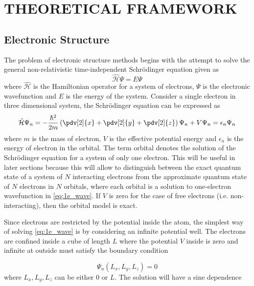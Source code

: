 \chapter{THEORETICAL FRAMEWORK}
\section{Electronic Structure}
The problem of electronic structure methods begins with the attempt to solve the general non-relativistic time-independent Schr\"{o}dinger equation given as \citep{Schroedinger1926}
    \begin{equation} \label{eq:schrodinger}
        \hat{\mathcal{H}} \Psi = E \Psi
    \end{equation}
where $\hat{\mathcal{H}}$ is the Hamiltonian operator for a system of electrons, $\Psi$ is the electronic wavefunction and $E$ is the energy of the system. Consider a single electron in three dimensional system, the Schr\"{o}dinger equation can be expressed as 
    \begin{equation} \label{eq:1e_wave}
        \hat{\mathcal{H}} \Psi_n = - \frac{\hbar^2}{2m} \left(\pdv[2]{x} + \pdv[2]{y} + \pdv[2]{z} \right) \Psi_n + V \Psi_n  = \epsilon_n \Psi_n
    \end{equation}
where $m$ is the mass of electron, $V$ is the effective potential energy and $\epsilon_n$ is the energy of electron in the orbital. The term orbital denotes the solution of the Schr\"{o}dinger equation for a system of only one electron. This will be useful in later sections because this will allow to distinguish between the exact quantum state of a system of $N$ interacting  electrons 
from the approximate quantum state of $N$ electrons in $N$ orbitals, where each orbital is a solution to one-electron wavefunction in \eqref{eq:1e_wave}. If $V$ is zero for the case of free electrons (i.e. non-interacting), then the orbital model is exact. 
 
Since electrons are restricted by the potential inside the atom, the simplest way of solving \eqref{eq:1e_wave} is by considering an infinite potential well. The electrons are confined inside a cube of length $L$ where the potential $V$ inside is zero and infinite at outside must satisfy the boundary condition

\begin{equation}
	\Psi_n(L_x,L_y,L_z) = 0	
\end{equation}
where $L_x,L_y,L_z$ can be either 0 or $L$. The solution will have a sine dependence

